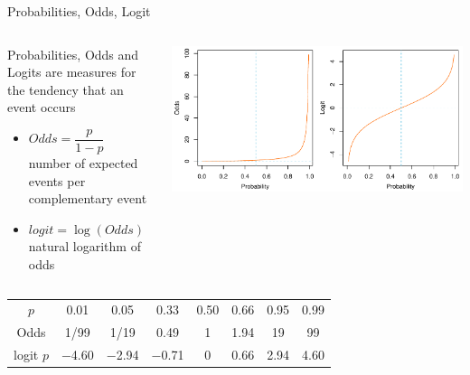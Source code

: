 \documentclass[aspectratio=169]{beamer}
\begin{document}
\begin{frame}{Probabilities, Odds, Logit}
  \begin{columns}
    \begin{column}{.35\textwidth}
\small
  Probabilities, Odds and Logits are measures for the tendency that an event
  occurs
  \begin{itemize}
    \item $Odds = \dfrac{p}{1 - p}$\\
      number of expected events per complementary event
    \item $logit = \log(Odds)$\\
      natural logarithm of odds
  \end{itemize} 
    \end{column}
    \begin{column}{.65\textwidth}
\includegraphics[scale=.55]{../figures/oddslogit}
    \end{column}
  \end{columns}
  \begin{center}
\begin{tabular}{|cccccccc|}
\hline
$p$       & 0.01    & 0.05 & 0.33 & 0.50 & 0.66 & 0.95 & 0.99 \\
Odds        & 1/99    & 1/19 & 0.49 & 1 & 1.94 & 19 & 99 \\
logit $p$ & $-$4.60 & $-$2.94 & $-$0.71 & 0 & 0.66 & 2.94 & 4.60 \\
\hline
\end{tabular}
  \end{center}
\end{frame}
\end{document}
